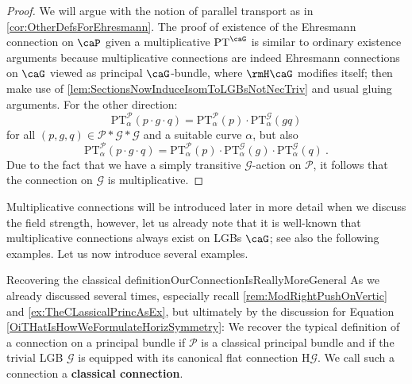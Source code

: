 \documentclass[reqno,a4paper,oneside]{amsart}
\theoremstyle{plain}
\theoremstyle{remark}
\theoremstyle{definition}
\begin{document}
\begin{proof}
\leavevmode\newline
We will argue with the notion of parallel transport as in \ref{cor:OtherDefsForEhresmann}.
The proof of existence of the Ehresmann connection on $\caP$ given a multiplicative ${\rm PT}^\caG$ is similar to ordinary existence arguments because multiplicative connections are indeed Ehresmann connections on $\caG$ viewed as principal $\caG$-bundle, where $\rmH \caG$ modifies itself; then make use of \ref{lem:SectionsNowInduceIsomToLGBsNotNecTriv} and usual gluing arguments. For the other direction:
\begin{equation*}
\mathrm{PT}_\alpha^{\mathcal{P}}(p \cdot g \cdot q)
=
\mathrm{PT}_\alpha^{\mathcal{P}}(p) \cdot \mathrm{PT}_\alpha^{\mathcal{G}}(gq)
\end{equation*}
for all $(p, g, q) \in \mathcal{P}* \mathcal{G} * \mathcal{G}$ and a suitable curve $\alpha$, but also
\begin{equation*}
\mathrm{PT}_\alpha^{\mathcal{P}}(p \cdot g \cdot q)
=
\mathrm{PT}_\alpha^{\mathcal{P}}(p) \cdot \mathrm{PT}_\alpha^{\mathcal{G}}(g) \cdot \mathrm{PT}_\alpha^{\mathcal{G}}(q)~.
\end{equation*}
Due to the fact that we have a simply transitive $\mathcal{G}$-action on $\mathcal{P}$, it follows that the connection on $\mathcal{G}$ is multiplicative. 
\end{proof}

Multiplicative connections will be introduced later in more detail when we discuss the field strength, {\color{Cred2} however, let us already note that it is well-known that multiplicative connections always exist on LGBs $\caG$; see also the following examples}.
Let us now introduce several examples.

\begin{examples}{Recovering the classical definition}{OurConnectionIsReallyMoreGeneral}
As we already discussed several times, especially recall \ref{rem:ModRightPushOnVertic} and \ref{ex:TheCLassicalPrincAsEx}, but ultimately by the discussion for Equation \eqref{OiTHatIsHowWeFormulateHorizSymmetry}: We recover the typical definition of a connection on a principal bundle if $\mathcal{P}$ is a classical principal bundle and if the trivial LGB $\mathcal{G}$ is equipped with its canonical flat connection $\mathrm{H}\mathcal{G}$. We call such a connection a \textbf{classical connection}.
\end{examples}
\end{document}
